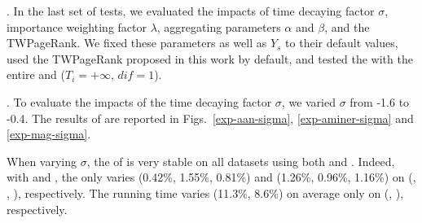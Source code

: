 .
In the last set of tests, we evaluated the impacts of time decaying factor $\sigma$, importance weighting factor $\lambda$, aggregating parameters $\alpha$ and $\beta$, and the TWPageRank. We fixed these parameters as well as $Y_s$ to their default values, used the TWPageRank proposed in this work by default, and tested the \PairAcc with the entire \recom and \fcita (\ie $T_i=+\infty$, $dif=1$).





.
To evaluate the impacts of the time decaying factor $\sigma$, we varied $\sigma$ from -1.6 to -0.4.
The results of \PairAcc are reported in Figs.~\ref{exp-aan-sigma}, \ref{exp-aminer-sigma} and \ref{exp-mag-sigma}.


When varying $\sigma$, the \PairAcc of \ensemblerank is very stable on all datasets using both \recom and \fcita. Indeed, with \recom and \fcita, the \PairAcc only varies (0.42\%, 1.55\%, 0.81\%) and (1.26\%, 0.96\%, 1.16\%) on (\aan, \aminer, \magdata), respectively.
%
The running time varies (11.3\%, 8.6\%) on average only on (\aminer, \magdata), respectively.




